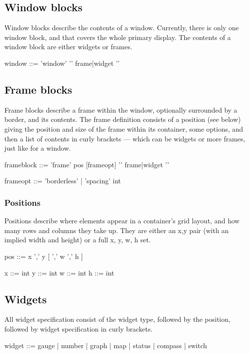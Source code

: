 \subsection{Window blocks}
Window blocks describe the contents of a window. Currently, there is only one window block, and that covers the whole
primary display. The contents of a window block are either widgets or frames.

\begin{v}
window      ::= 'window' '{' {frame|widget} '}'
\end{v}

\subsection{Frame blocks}
Frame blocks describe a frame within the window, optionally surrounded by a border, and its contents.
The frame definition consists of a position (see below) giving the position and size of the frame within its container,
some options, and then a list of contents in curly brackets --- which can be widgets or more frames, just like for a window.
\begin{v}
frameblock  ::= 'frame' pos [{frameopt}] '{' {frame|widget} '}'

frameopt    ::= 'borderless'
            |   'spacing' int

\end{v}

\subsubsection{Positions}
Positions describe where elements appear in a container's
grid layout, and how many rows and columns they take up. They
are either an x,y pair (with an implied width and height) or a full
x, y, w, h set.
\begin{v}
pos         ::=  x ',' y [ ',' w ',' h ]

x           ::= int
y           ::= int
w           ::= int
h           ::= int
\end{v}

\subsection{Widgets}
All widget specification consist of the widget type, followed by the position,
followed by widget specification in curly brackets.

\begin{v}
widget      ::= gauge | number | graph | map | status |
                compass | switch
\end{v}

